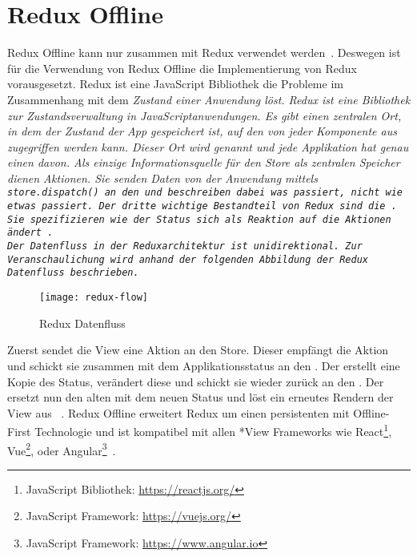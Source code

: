 \section{\label{sub:reduxoffline}Redux Offline}
Redux Offline kann nur zusammen mit Redux verwendet werden~\cite{redux-req}. Deswegen ist für die Verwendung von Redux Offline die Implementierung von Redux vorausgesetzt.
%
%
Redux ist eine JavaScript Bibliothek die Probleme im Zusammenhang mit dem \it{Zustand} einer Anwendung löst.
Redux ist eine Bibliothek zur Zustandsverwaltung in JavaScriptanwendungen.
Es gibt einen zentralen Ort, in dem der \it{Zustand} der App gespeichert ist, auf den von jeder Komponente aus zugegriffen werden kann.
Dieser Ort wird  genannt und jede Applikation hat genau einen davon. 
Als einzige Informationsquelle für den Store als zentralen Speicher dienen Aktionen. 
Sie senden Daten von der Anwendung mittels \tt{store.dispatch()} an den  und beschreiben dabei was passiert, nicht wie etwas passiert.
Der dritte wichtige Bestandteil von Redux sind die . Sie spezifizieren wie der Status sich als Reaktion auf die Aktionen ändert~\cite{redux}.\\
Der Datenfluss in der Reduxarchitektur ist unidirektional. Zur Veranschaulichung wird anhand der folgenden Abbildung der Redux Datenfluss beschrieben.
%
\begin{figure}[H]
  \centering
  \texttt{[image: redux-flow]}
  \grayRule
  \caption{Redux Datenfluss}
  \label{fig:rdx-dataflow}
\end{figure}
% 
Zuerst sendet die View eine Aktion an den Store. Dieser empfängt die Aktion und schickt sie zusammen mit dem Applikationsstatus an den .
Der  erstellt eine Kopie des Status, verändert diese und schickt sie wieder zurück an den . Der  ersetzt nun den alten mit dem neuen Status und löst ein erneutes Rendern der View aus ~\cite{reduxflow}.
% 
% 
Redux Offline erweitert Redux um einen persistenten  mit Offline-First Technologie und  ist kompatibel mit allen *View Frameworks wie React\footnote{JavaScript Bibliothek: \url{https://reactjs.org/}}, Vue\footnote{JavaScript Framework: \url{https://vuejs.org/}}, oder Angular\footnote{JavaScript Framework: \url{https://www.angular.io}}~\cite{redux-offline-compabilaty}.
